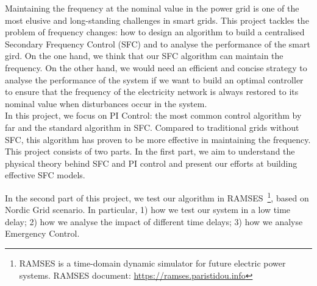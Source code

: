 
Maintaining the frequency at the nominal value in the power grid is one of the most elusive and long-standing challenges in smart grids. This project tackles the problem of frequency changes: how to design an algorithm to build a centralised Secondary Frequency Control (SFC) and to analyse the performance of the smart gird. On the one hand, we think that our SFC algorithm can maintain the frequency. On the other hand, we would need an efficient and concise strategy to analyse the performance of the system if we want to build an optimal controller to ensure that the frequency of the electricity network is always restored to its nominal value when disturbances occur in the system.\\

In this project, we focus on PI Control: the most common control algorithm by far and the standard algorithm in SFC. Compared to traditional grids without SFC, this algorithm has proven to be more effective in maintaining the frequency.\\

This project consists of two parts. In the first part, we aim to understand the physical theory behind SFC and PI control and present our efforts at building effective SFC models. 

In the second part of this project, we test our algorithm in RAMSES~\footnote{RAMSES is a time-domain dynamic simulator for future electric power systems. RAMSES document: \href{https://ramses.paristidou.info}{https://ramses.paristidou.info}}\cite{aristidou2015parallel}, \cite{aristidou2014schur} based on Nordic Grid scenario. In particular, 1) how we test our system in a low time delay; 2) how we analyse the impact of different time delays; 3) how we analyse Emergency Control.